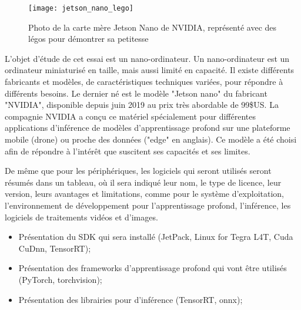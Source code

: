 {\color{red}
\label{jetson_nano_lego}
\begin{figure}
    \centering
    \texttt{[image: jetson\_nano\_lego]}
    \caption{Photo de la carte mère Jetson Nano de NVIDIA, représenté avec des légos pour démontrer sa petitesse}
    \label{fig:jetson_nano_lego}
\end{figure}

\par L'objet d'étude de cet essai est un nano-ordinateur. Un nano-ordinateur est un ordinateur miniaturisé en taille, mais aussi limité en capacité. Il existe différents fabricants et modèles, de caractéristiques techniques variées, pour répondre à différents besoins. Le dernier né est le modèle "Jetson nano" du fabricant "NVIDIA", disponible depuis juin 2019 au prix très abordable de 99\$US. La compagnie NVIDIA a conçu ce matériel spécialement pour différentes applications d'inférence de modèles d'apprentissage profond sur une plateforme mobile (drone) ou proche des données ("edge" en anglais). Ce modèle a été choisi afin de répondre à l'intérêt que suscitent ses capacités et ses limites. 

\par De même que pour les périphériques, les logiciels qui seront utilisés seront résumés dans un tableau, où il sera indiqué leur nom, le type de licence, leur version, leurs avantages et limitations, comme pour le système d'exploitation, l'environnement de développement pour l'apprentissage profond, l'inférence, les logiciels de traitements vidéos et d'images. 
\begin{itemize}
   \item Présentation du SDK qui sera installé (JetPack, Linux for Tegra L4T, Cuda CuDnn, TensorRT);
   \item Présentation des frameworks d’apprentissage profond qui vont être utilisés (PyTorch, torchvision);
   \item Présentation des librairies pour d'inférence (TensorRT, onnx);
\end{itemize}
}